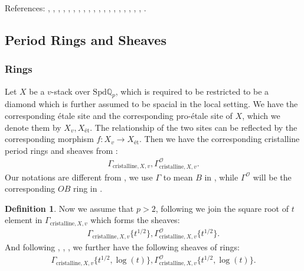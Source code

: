 \documentclass[12pt]{book}
\theoremstyle{definition}
\newtheorem{definition}{Definition}
\begin{document}
\noindent References: \cite{Sch1}, \cite{Sch2}, \cite{FS}, \cite{KL1}, \cite{KL2}, \cite{BL1}, \cite{BL2}, \cite{BS}, \cite{BHS}, \cite{Fon1}, \cite{CS1}, \cite{CS2}, \cite{BK}, \cite{BBK}, \cite{BBBK}, \cite{KKM}, \cite{KM}, \cite{LZ}, \cite{TT}, \cite{M}.


\subsection{Period Rings and Sheaves}


\subsubsection{Rings}

\noindent Let $X$ be a $v$-stack over $\mathrm{Spd}\mathbb{Q}_p$, which is required to be restricted to be a diamond which is further assumed to be spacial in the local setting. We have the corresponding \'etale site and the corresponding pro-\'etale site of $X$, which we denote them by $X_{v},X_\text{\'et}$. The relationship of the two sites can be reflected by the corresponding morphism $f:X_{v}\longrightarrow X_\text{\'et}$. Then we have the corresponding cristalline period rings and sheaves from \cite{TT}:
\begin{align}
\Gamma_{\text{cristalline},X,v}, \Gamma^\mathcal{O}_{\text{cristalline},X,v}.
\end{align}
Our notations are different from \cite{TT}, we use $\Gamma$ to mean $B$ in \cite{TT}, while $\Gamma^\mathcal{O}$ will be the corresponding $OB$ ring in \cite{TT}.\\

\begin{definition}
\indent Now we assume that $p>2$, following \cite{BS} we join the square root of $t$ element in $\Gamma_{\text{cristalline},X,v}$ which forms the sheaves:
\begin{align}
\Gamma_{\text{cristalline},X,v}\{t^{1/2}\},\Gamma^\mathcal{O}_{\text{cristalline},X,v}\{t^{1/2}\}.
\end{align}
And following \cite{BL1}, \cite{BL2}, \cite{Fon1}, \cite{BHS} we further have the following sheaves of rings:
\begin{align}
\Gamma_{\text{cristalline},X,v}\{t^{1/2},\log(t)\},\Gamma^\mathcal{O}_{\text{cristalline},X,v}\{t^{1/2},\log(t)\}.
\end{align}
\end{definition}
\end{document}
